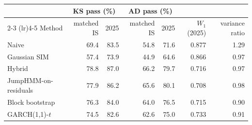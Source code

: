 \begin{tabular}{lrrrrrr}
\toprule
 & \multicolumn{2}{c}{KS pass (\%)} & \multicolumn{2}{c}{AD pass (\%)} & & \\
\cmidrule(lr){2-3} \cmidrule(lr){4-5}
Method & matched IS & 2025 & matched IS & 2025 & $W_1$ (2025) & variance ratio \\
\midrule
Naive & 69.4 & 83.5 & 54.8 & 71.6 & 0.877 & 1.29 \\
Gaussian SIM & 57.4 & 73.9 & 44.9 & 64.6 & 0.866 & 0.97 \\
Hybrid & 78.8 & 87.0 & 66.2 & 79.7 & 0.716 & 0.97 \\
JumpHMM-on-residuals & 77.9 & 86.2 & 65.6 & 80.1 & 0.708 & 0.98 \\
Block bootstrap & 76.3 & 84.0 & 64.0 & 76.5 & 0.715 & 0.90 \\
GARCH(1,1)-$t$ & 74.5 & 82.6 & 62.6 & 75.0 & 0.733 & 0.91 \\
\bottomrule
\end{tabular}
